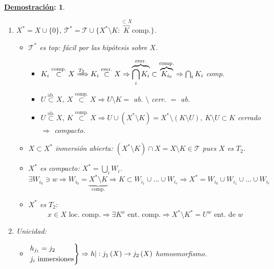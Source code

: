 \documentclass[10pt,a4paper,openright]{book}
\theoremstyle{break}
\newtheorem*{demo}{\underline{Demostración}:}
\begin{document}
\begin{demo}
\begin{enumerate}
    \item $X^* = X \cup \{0\},\ \mathcal{T}^* = \mathcal{T} \cup \{X^* \setminus K: \overbrace{K}^{\subset X} \text{comp.}\}$.
    \begin{itemize}
        \item $\mathcal{T}^*$ es top: fácil por las hipótesis sobre $X$.
        \begin{itemize}
            \item $K_i \stackrel{\text{comp.}}{\subset} X \xRightarrow{T_2} K_i \stackrel{\text{cerr.}}{\subset} X \Rightarrow \overbrace{\bigcap_{i} K_i}^{\text{cerr.}} \subset \overbrace{K_{i_0}}^{\text{comp.}} \Rightarrow \bigcap_{i} K_i$ comp.
            \item $U \stackrel{\text{ab.}}{\subset} X,\ X \stackrel{\text{comp.}}{\subset} X \Rightarrow U \setminus K =$ ab. $\setminus$ cerr. $ = $ ab.
            \item $U \stackrel{\text{ab.}}{\subset} X,\ K \stackrel{\text{comp.}}{\subset} X \Rightarrow U \cup \left( X^* \setminus K \right) = X^* \setminus \left( K \setminus U \right),\ K \setminus U \subset K$ cerrado $\Rightarrow$ compacto.
        \end{itemize}
        \item $X \subset X^*$ inmersión abierta: $\left( X^* \setminus K \right) \cap X = X \setminus K \in \mathcal{T}$ pues $X$ es $T_2$.
        \item $X^*$ es compacto: $X^* = \bigcup_{i} W_i$.
        \[
        \exists W_{i_0} \ni w \Rightarrow W_{i_0} = \underbrace{X^* \setminus K}_{\text{comp.}} \Rightarrow K \subset W_{i_1} \cup \ldots \cup W_{i_r} \Rightarrow X^* = W_{i_0} \cup W_{i_1} \cup \ldots \cup W_{i_r}  
        \]
        \item $X^*$ es $T_2:$
        \[
        x \in X \text{ loc. comp.} \Rightarrow \exists K^x \text{ ent. comp.} \Rightarrow X^* \setminus K^* = U^w \text{ ent. de } w
        \]
    \end{itemize}

    \item Unicidad:
    \begin{itemize}
        \item $\begin{rcases}
           h_{j_1} = j_2\\
           j_i \text{ inmersiones} 
        \end{rcases} \Rightarrow h|: j_1\left( X \right) \rightarrow j_2 \left( X \right)$ homeomorfismo.


\end{itemize}
\end{enumerate}
\end{demo}
\end{document}
